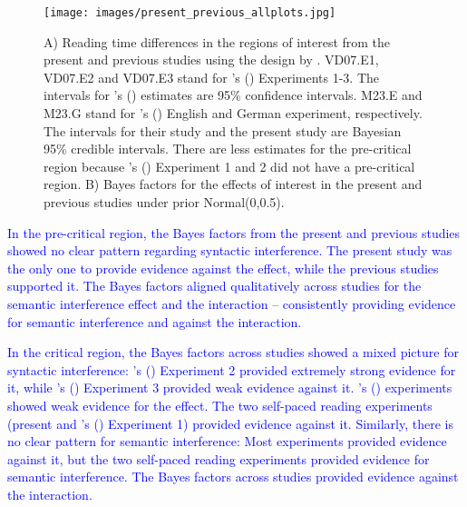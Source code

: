\documentclass[a4paper, man, floatsintext]{apa7}
\begin{document}
{\begin{figure}
    \caption{A) Reading time differences in the regions of interest from the present and previous studies using the design by \textcite{vandyke07}. VD07.E1, VD07.E2 and VD07.E3 stand for \citeauthor{vandyke07}'s (\citeyear{vandyke07}) Experiments 1-3. The intervals for \citeauthor{vandyke07}'s (\citeyear{vandyke07}) estimates are 95\% confidence intervals. M23.E and M23.G stand for \citeauthor{mertzen}'s (\citeyear{mertzen}) English and German experiment, respectively. The intervals for their study and the present study are Bayesian 95\% credible intervals. There are less estimates for the pre-critical region because \citeauthor{vandyke07}'s (\citeyear{vandyke07}) Experiment 1 and 2 did not have a pre-critical region. B) Bayes factors for the effects of interest in the present and previous studies under prior Normal(0,0.5).}
    \label{fig:previous_vs_present}
    \centering
    \texttt{[image: images/present\_previous\_allplots.jpg]}
\end{figure}
\clearpage

\textcolor{blue}{In the pre-critical region, the Bayes factors from the present and previous studies showed no clear pattern regarding syntactic interference. The present study was the only one to provide evidence against the effect, while the previous studies supported it. The Bayes factors aligned qualitatively across studies for the semantic interference effect and the interaction -- consistently providing evidence for semantic interference and against the interaction.}

\textcolor{blue}{In the critical region, the Bayes factors across studies showed a mixed picture for syntactic interference: \citeauthor{vandyke07}'s (\citeyear{vandyke07}) Experiment 2 provided extremely strong evidence for it, while \citeauthor{vandyke07}'s (\citeyear{vandyke07}) Experiment 3 provided weak evidence against it. \citeauthor{mertzen}'s (\citeyear{mertzen}) experiments showed weak evidence for the effect. The two self-paced reading experiments (present and \citeauthor{vandyke07}'s (\citeyear{vandyke07}) Experiment 1) provided evidence against it. Similarly, there is no clear pattern for semantic interference: Most experiments provided evidence against it, but the two self-paced reading experiments provided evidence for semantic interference. The Bayes factors across studies provided evidence against the interaction.}

}
\end{document}

